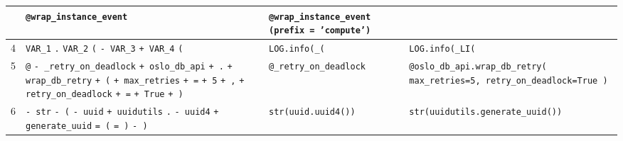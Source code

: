 \documentclass[submit,techrep,noauthor]{ipsj}
\begin{document}
\begin{table}[t]
\begin{tabular}{r|p{6cm}|p{5cm}|p{5cm}}
        &
        \texttt{@wrap\_instance\_event}
        &
        \texttt{@wrap\_instance\_event\newline
        (prefix = 'compute')}\\
        \hline
        4 &
        \colorbox{lightgray!50}{\texttt{VAR\_1}} \colorbox{lightgray!50}{\texttt{.}} \colorbox{lightgray!50}{\texttt{VAR\_2}} \colorbox{lightgray!50}{\texttt{(}}
        \colorbox{lightgray!50}{\texttt{- VAR\_3}} \colorbox{lightgray!50}{\texttt{+ VAR\_4}}
        \colorbox{lightgray!50}{\texttt{(}}
        &
        \texttt{LOG.info(\_(}
        &
        \texttt{LOG.info(\_LI(}\\
        \hline
        5 &
        \colorbox{lightgray!50}{\texttt{@}} \colorbox{lightgray!50}{\texttt{- \_retry\_on\_deadlock}} \colorbox{lightgray!50}{\texttt{+ oslo\_db\_api}}
        \newline
        \colorbox{lightgray!50}{\texttt{+ .}} \colorbox{lightgray!50}{\texttt{+ wrap\_db\_retry}} \colorbox{lightgray!50}{\texttt{+ (}}
        \newline
        \colorbox{lightgray!50}{\texttt{+ max\_retries}} \colorbox{lightgray!50}{\texttt{+ =}} \colorbox{lightgray!50}{\texttt{+ 5}} \colorbox{lightgray!50}{\texttt{+ ,}} 
        \newline
        \colorbox{lightgray!50}{\texttt{+ retry\_on\_deadlock}} \colorbox{lightgray!50}{\texttt{+ =}} \colorbox{lightgray!50}{\texttt{+ True}} \colorbox{lightgray!50}{\texttt{+ )}}
        &
        \texttt{@\_retry\_on\_deadlock}
        &
        \texttt{@oslo\_db\_api.wrap\_db\_retry(
        \newline
        max\_retries=5, retry\_on\_deadlock=True
        \newline
        )}\\
        \hline
        6 &
        \colorbox{lightgray!50}{\texttt{- str}} \colorbox{lightgray!50}{\texttt{- (}} \colorbox{lightgray!50}{\texttt{- uuid}} \colorbox{lightgray!50}{\texttt{+ uuidutils}} \colorbox{lightgray!50}{\texttt{.}} \colorbox{lightgray!50}{\texttt{- uuid4}} \colorbox{lightgray!50}{\texttt{+ generate\_uuid}} \colorbox{lightgray!50}{\texttt{= (}} 
        \colorbox{lightgray!50}{\texttt{= )}} \colorbox{lightgray!50}{\texttt{- )}}
        &
        \texttt{str(uuid.uuid4())}
        &
        \texttt{str(uuidutils.generate\_uuid())}\\
        \hline
    \end{tabular}
\end{table}
\end{document}
